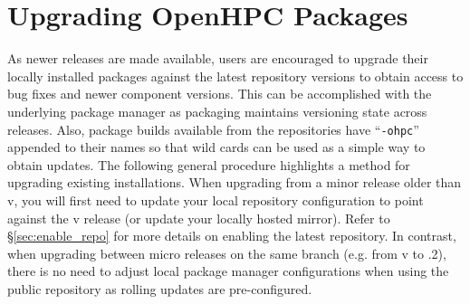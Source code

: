 \section{Upgrading OpenHPC Packages}  \label{appendix:upgrade}


As newer \OHPC{} releases are made available, users are encouraged to upgrade
their locally installed packages against the latest repository versions to
obtain access to bug fixes and newer component versions. This can be
accomplished with the underlying package manager as \OHPC{} packaging maintains
versioning state across releases. Also, package builds available from the
\OHPC{} repositories have ``\texttt{-ohpc}'' appended to their names so that
wild cards can be used as a simple way to obtain updates. The following general
procedure highlights a method for upgrading existing installations.
When upgrading from a minor release older than v\OHPCVerTree{}, you will first
need to update your local \OHPC{} repository configuration to point against the
v\OHPCVerTree{} release (or update your locally hosted mirror). Refer to
\S\ref{sec:enable_repo} for more details on enabling the latest
repository. In contrast, when upgrading between micro releases on the same
branch (e.g. from v\OHPCVerTree{} to \OHPCVerTree{}.2), there is no need to
adjust local package manager configurations when using the public repository as
rolling updates are pre-configured.

